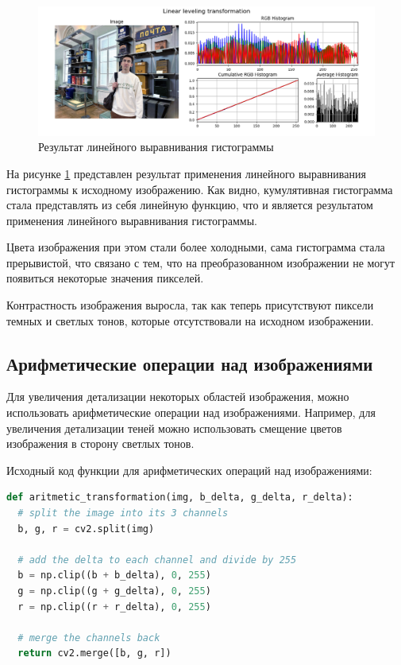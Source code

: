 \begin{figure}[H]
    \centering
    \includegraphics[width=\textwidth]{../results/Linear leveling transformation.png}
    \caption{Результат линейного выравнивания гистограммы}
    \label{fig:linear}
\end{figure}

На рисунке \ref{fig:linear} представлен результат применения линейного выравнивания гистограммы к исходному изображению. Как видно, кумулятивная гистограмма стала представлять из себя линейную функцию, что и является результатом применения линейного выравнивания гистограммы. 

Цвета изображения при этом стали более холодными, сама гистограмма стала прерывистой, что связано с тем, что на преобразованном изображении не могут появиться некоторые значения пикселей. 

Контрастность изображения выросла, так как теперь присутствуют пиксели темных и светлых тонов, которые отсутствовали на исходном изображении. 

\subsection{Арифметические операции над изображениями}

Для увеличения детализации некоторых областей изображения, можно использовать арифметические операции над изображениями. Например, для увеличения детализации теней можно использовать смещение цветов изображения в сторону светлых тонов.

Исходный код функции для арифметических операций над изображениями:

\begin{lstlisting}[language=Python]
def aritmetic_transformation(img, b_delta, g_delta, r_delta):
  # split the image into its 3 channels
  b, g, r = cv2.split(img)

  # add the delta to each channel and divide by 255
  b = np.clip((b + b_delta), 0, 255) 
  g = np.clip((g + g_delta), 0, 255) 
  r = np.clip((r + r_delta), 0, 255) 

  # merge the channels back
  return cv2.merge([b, g, r])
\end{lstlisting}


